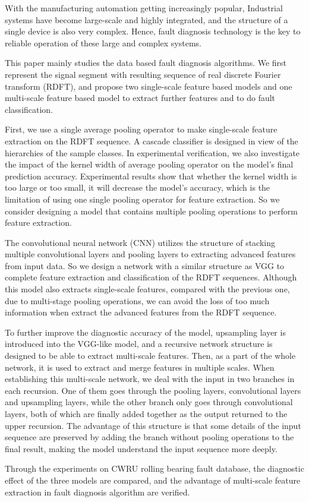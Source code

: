 \begin{eabstract}
  With the manufacturing automation getting increasingly popular,
  Industrial systems have become large-scale and highly integrated,
  and the structure of a single device is also very complex. Hence,
  fault diagnosis technology is the key to reliable operation of
  these large and complex systems.

  This paper mainly studies the data based fault diagnosis algorithms.
  We first represent the signal segment with resulting sequence of real
  discrete Fourier transform (RDFT), and propose two single-scale
  feature based models and one multi-scale feature based model to
  extract further features and to do fault classification.

  First, we use a single average pooling operator to make single-scale
  feature extraction on the RDFT sequence. A cascade classifier is
  designed in view of the hierarchies of the sample classes.
  In experimental verification, we also investigate the impact of the
  kernel width of average pooling operator on the model's final prediction
  accuracy. Experimental results show that whether the kernel width is
  too large or too small, it will decrease the model's accuracy, which is the
  limitation of using one single pooling operator for feature extraction.
  So we consider designing a model that contains multiple pooling operations
  to perform feature extraction.

  The convolutional neural network (CNN) utilizes the structure of stacking
  multiple convolutional layers and pooling layers to extracting advanced 
  features from input data. So we design a network with a similar structure
  as VGG to complete feature extraction and classification of the RDFT sequences.
  Although this model also extracts single-scale features, compared with the
  previous one, due to multi-stage pooling operations, we can avoid the loss
  of too much information when extract the advanced features from the RDFT
  sequence.

  To further improve the diagnostic accuracy of the model, upsampling layer is
  introduced into the VGG-like model, and a recursive network structure is
  designed to be able to extract multi-scale features. Then, as a part of the 
  whole network, it is used to extract and merge features in multiple scales.
  When establishing this multi-scale network, we deal with the input in two
  branches in each recursion. One of them goes through the pooling layers,
  convolutional layers and upsampling layers, while the other branch only goes
  through convolutional layers, both of which are finally added together as the
  output returned to the upper recursion. The advantage of this structure is
  that some details of the input sequence are preserved by adding the branch
  without pooling operations to the final result, making the model understand
  the input sequence more deeply.

  Through the experiments on CWRU rolling bearing fault database, the diagnostic
  effect of the three models are compared, and the advantage of multi-scale feature
  extraction in fault diagnosis algorithm are verified.
\end{eabstract}

